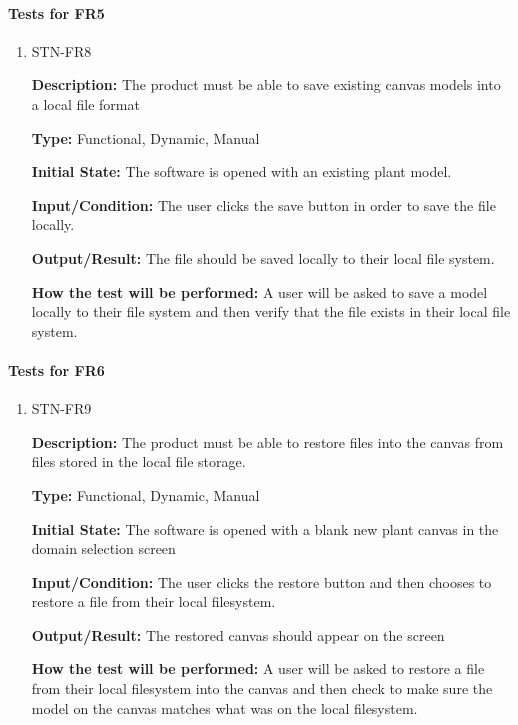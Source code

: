 \documentclass[12pt, titlepage]{article}
\begin{document}
\paragraph{Tests for FR5}

\begin{enumerate}

\item{STN-FR8\\}

\textbf{Description:} The product must be able to save existing canvas models into a local file format

\textbf{Type:} Functional, Dynamic, Manual

\textbf{Initial State:} The software is opened with an existing plant model.

\textbf{Input/Condition:} The user clicks the save button in order to save the file locally.

\textbf{Output/Result:} The file should be saved locally to their local file system.

\textbf{How the test will be performed:} A user will be asked to save a model locally to their file system and then verify that the file exists in their local file system. 

\end{enumerate}

\paragraph{Tests for FR6}

\begin{enumerate}

\item{STN-FR9\\}

\textbf{Description:} The product must be able to restore files into the canvas from files stored in the local file storage.

\textbf{Type:} Functional, Dynamic, Manual

\textbf{Initial State:} The software is opened with a blank new plant canvas in the domain selection screen

\textbf{Input/Condition:} The user clicks the restore button and then chooses to restore a file from their local filesystem.

\textbf{Output/Result:} The restored canvas should appear on the screen

\textbf{How the test will be performed:} A user will be asked to restore a file from their local filesystem into the canvas and then check to make sure the model on the canvas matches what was on the local filesystem. 

\end{enumerate}
\end{document}
